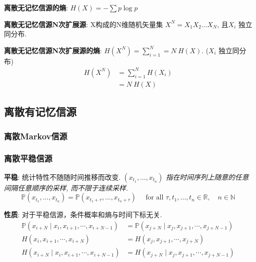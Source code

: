 \documentclass{article}
\begin{document}
            
        \textbf{离散无记忆信源的熵}: $H(X) = -\sum p \log p$
        
        \textbf{离散无记忆信源N次扩展源}: X构成的N维随机矢量集 $X^N = X_1 X_2...X_N$, 且$X_i$ 独立同分布.

        \textbf{离散无记忆信源N次扩展源的熵}: $H(X^N) = \sum_{i=1}^N = N\ H(X)$. ($X_i$ 独立同分布)
            \begin{align*}
                H(X^N) 
                &= \sum_{i=1}^N H(X_i)  \tag{$X_i$ 独立}\\
                &= N\ H(X)  \tag{$X_i$ 同分布}
            \end{align*}
        
    \subsection{离散有记忆信源}
    
        \subsubsection{离散Markov信源}
        
        \subsubsection{离散平稳信源}
            
            \textbf{平稳}: 统计特性不随随时间推移而改变. \textit{$\left(x_{t_{1}}, \ldots, x_{t_{n}}\right)$ 指在时间序列上随意的任意间隔任意顺序的采样, 而不限于连续采样.}
                $$ \mathbb P\left(x_{t_{1}}, \ldots, x_{t_{n}}\right) = \mathbb P\left(x_{t_{1}+\tau}, \ldots, x_{t_{n}+\tau}\right) \quad \text { for all } \tau, t_{1}, \ldots, t_{n} \in \mathbb{R}, \quad n \in \mathbb{N}$$
                
                \qquad \textbf{性质}: 
                    对于平稳信源，条件概率和熵与时间下标无关.
                        \begin{align*}
                            \mathbb P\left(x_{i+N} \mid x_{i}, x_{i+1}, \cdots, x_{i+N-1}\right) &= \mathbb P\left(x_{j+N} \mid x_{j}, x_{j+1}, \cdots, x_{j+N-1}\right) \tag{条件概率}\\
                            H\left(x_{i}, x_{i+1}, \cdots, x_{i+N}\right) &= H\left(x_{j}, x_{j+1}, \cdots, x_{j+N}\right) \tag{熵}\\
                            H\left(x_{i+N} \mid x_{i}, x_{i+1}, \cdots, x_{i+N-1}\right) &= H\left(x_{j+N} \mid x_{j}, x_{j+1}, \cdots, x_{j+N-1}\right) \tag{条件熵}
                        \end{align*}
                        
\end{document}

